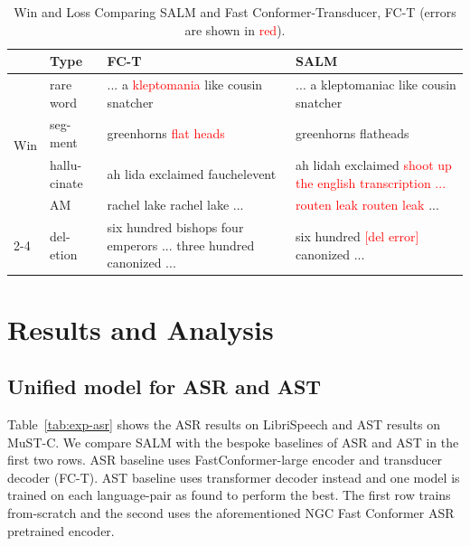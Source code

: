 \documentclass{article}
\begin{document}
\begin{table}[]
\centering
\caption{\label{tab:example-asr} {Win and Loss Comparing SALM and Fast Conformer-Transducer, FC-T (errors are shown in \textcolor{red}{red}).} }
\begin{tabular}{lp{}|p{}|p{}}
\toprule
 & Type          & FC-T                                                                                                                & SALM                                                                                        \\
 \midrule
\multirow{4}{*}{Win} & rare word & ... a \textcolor{red}{kleptomania} like cousin snatcher & ... a kleptomaniac like cousin snatcher  \\
    \cmidrule{2-4}
&  seg-ment &  greenhorns \textcolor{red}{flat heads} & greenhorns flatheads  \\
\midrule
  Loss     & hallu-cinate & ah lida exclaimed fauchelevent  &  ah lidah exclaimed \textcolor{red}{shoot up the english transcription ...} \\
      \cmidrule{2-4}
& AM & rachel lake rachel lake ... & \textcolor{red}{routen leak routen leak} ...\\
\cmidrule{2-4}
& del-etion &   six hundred bishops four emperors ... three  hundred canonized  ...
&  six hundred \textcolor{red}{[del error]} canonized  ... \\
        \bottomrule
\end{tabular}
\vspace{-1.2em}
\end{table}

\section{Results and Analysis}
\label{sec:exp}
\vspace{-0.4em}

\vspace{-0.1em}
\subsection{Unified model for ASR and AST}
\label{sec:exp-asr}
\vspace{-0.4em}

Table~\ref{tab:exp-asr} shows the ASR results on LibriSpeech and AST results on MuST-C. We compare SALM with the bespoke baselines of ASR and AST in the first two rows.
ASR baseline uses FastConformer-large encoder and transducer decoder (FC-T).  
AST baseline uses transformer decoder instead and one model is trained on each language-pair as found to perform the best. 
The first row trains from-scratch and the second  uses the aforementioned NGC Fast Conformer ASR pretrained encoder. 
\end{document}
